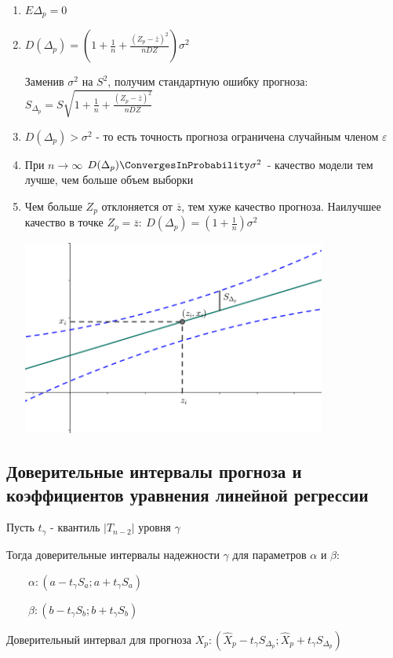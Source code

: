 \begin{enumerate}
    \item $E \Delta_p = 0$
    \item $D (\Delta_p) = \left(1 + \frac{1}{n} + \frac{(Z_p - \overline{z})^2}{n DZ}\right) \sigma^2$

    Заменив $\sigma^2$ на $S^2$, получим стандартную ошибку прогноза: $S_{\Delta_p} = S \sqrt{1 + \frac{1}{n} + \frac{(Z_p - \overline{z})^2}{n DZ}}$

    \item $D(\Delta_p) > \sigma^2$ - то есть точность прогноза ограничена случайным членом $\varepsilon$

    \item При $n \to \infty$ $D(\Delta_p) \ConvergesInProbability \sigma^2$ - качество модели тем лучше, чем больше объем выборки

    \item Чем больше $Z_p$ отклоняется от $\overline{z}$, тем хуже качество прогноза. Наилучшее качество в точке $Z_p = \overline{z}: \ D(\Delta_p) = \left(1 + \frac{1}{n}\right) \sigma^2$


    \begin{center}
        \includegraphics[width=10cm]{mathstat/images/mathstat_2025_04_15_1}
    \end{center}
\end{enumerate}

\subsection{Доверительные интервалы прогноза и коэффициентов уравнения линейной регрессии}

Пусть $t_\gamma$ - квантиль $|T_{n - 2}|$ уровня $\gamma$

Тогда доверительные интервалы надежности $\gamma$ для параметров $\alpha$ и $\beta$:

$\qquad \alpha: (a - t_\gamma S_a; a + t_\gamma S_a)$

$\qquad \beta: (b - t_\gamma S_b; b + t_\gamma S_b)$

Доверительный интервал для прогноза $X_p: (\hat X_p - t_\gamma S_{\Delta_p}; \hat X_p + t_\gamma S_{\Delta_p})$

